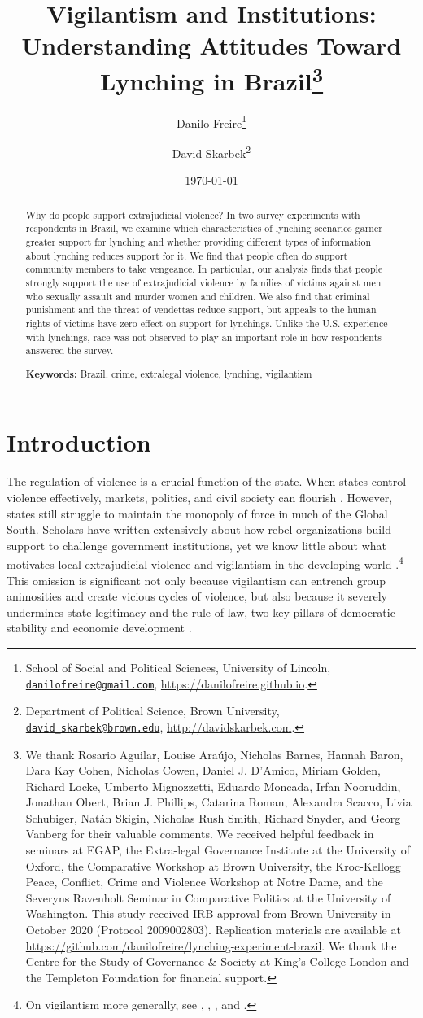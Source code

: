 \documentclass[12pt,a4paper]{article}
\title{Vigilantism and Institutions:\\ Understanding Attitudes Toward Lynching in Brazil\footnote{We thank Rosario Aguilar, Louise Araújo, Nicholas Barnes, Hannah Baron, Dara Kay Cohen, Nicholas Cowen, Daniel J. D'Amico, Miriam Golden, Richard Locke, Umberto Mignozzetti, Eduardo Moncada, Irfan Nooruddin, Jonathan Obert, Brian J. Phillips, Catarina Roman, Alexandra Scacco, Livia Schubiger, Natán Skigin, Nicholas Rush Smith, Richard Snyder, and Georg Vanberg for their valuable comments. We received helpful feedback in seminars at EGAP, the Extra-legal Governance Institute at the University of Oxford, the Comparative Workshop at Brown University, the Kroc-Kellogg Peace, Conflict, Crime and Violence Workshop at Notre Dame, and the Severyns Ravenholt Seminar in Comparative Politics at the University of Washington. This study received IRB approval from Brown University in October 2020 (Protocol 2009002803). Replication materials are available at \url{https://github.com/danilofreire/lynching-experiment-brazil}. We thank the Centre for the Study of Governance \& Society at King's College London and the Templeton Foundation for financial support.}}
\author{Danilo Freire\footnote{School of Social and Political Sciences, University of Lincoln, \href{mailto:danilofreire@gmail.com}{\texttt{danilofreire@gmail.com}}, \url{https://danilofreire.github.io}.} \and David Skarbek\footnote{Department of Political Science, Brown University, \href{mailto:david_skarbek@brown.edu}{\texttt{david\_skarbek@brown.edu}}, \url{http://davidskarbek.com}.}}
\date{\today}
\begin{document}
\maketitle

\begin{abstract}
\doublespacing \noindent Why do people support extrajudicial violence? In two survey experiments with respondents in Brazil, we examine which characteristics of lynching scenarios garner greater support for lynching and whether providing different types of information about lynching reduces support for it. We find that people often do support community members to take vengeance. In particular, our analysis finds that people strongly support the use of extrajudicial violence by families of victims against men who sexually assault and murder women and children. We also find that criminal punishment and the threat of vendettas reduce support, but appeals to the human rights of victims have zero effect on support for lynchings. Unlike the U.S. experience with lynchings, race was not observed to play an important role in how respondents answered the survey.
\vspace{.25cm}

\noindent \textbf{Keywords:} Brazil, crime, extralegal violence, lynching, vigilantism
\vspace{.25cm}

\end{abstract}

\newpage

\section*{Introduction}
\label{sec:introduction}

\doublespacing

The regulation of violence is a crucial function of the state. When states
control violence effectively, markets, politics, and civil society can flourish
\citep{besley2011pillars, north2009violence}. However, states still struggle to
maintain the monopoly of force in much of the Global South. Scholars have
written extensively about how rebel organizations build support to challenge
government institutions, yet we know little about what motivates local
extrajudicial violence and vigilantism in the developing world
\citep{bateson2020politics}.\footnote{On vigilantism more generally, see
\citet{cohen2022collective}, \citet{schuberth2013challenging},
\citet{smith2019contradictions}, and \citet{zizumbo2017community}.} This
omission is significant not only because vigilantism can entrench group
animosities and create vicious cycles of violence, but also because it severely
undermines state legitimacy and the rule of law, two key pillars of democratic
stability and economic development \citep{jung2020lynching, tankebe2009self}.
\end{document}
